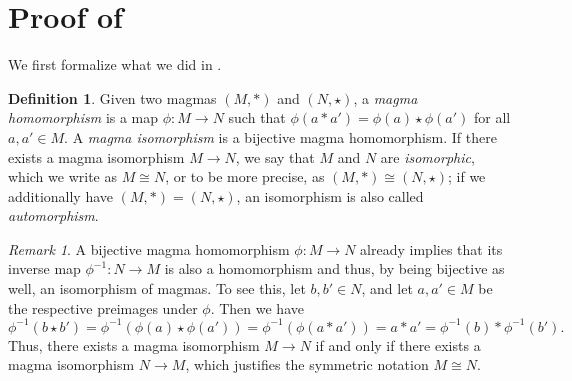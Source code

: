 \documentclass[12pt]{article}
\let\Cref\crtCref
\theoremstyle{definition}
\newtheorem{definition}[theorem]{Definition}
\theoremstyle{remark}
\newtheorem*{remark}{Remark}
\begin{document}
	\section{Proof of \Cref{thm:main}}\label{sec:pot}
	 We first formalize what we did in \Cref{ex:tables}.
	\begin{definition}\label{def:morphisms}
		Given two magmas $(M,\ast)$ and $(N,\star)$, a \emph{magma homomorphism} is a map $\phi \colon M \to N$ such that $\phi(a\ast a')=\phi(a)\star\phi(a')$ for all $a,a' \in M$. A \emph{magma isomorphism} is a bijective magma homomorphism. If there exists a magma isomorphism $M \to N$, we say that $M$ and $N$ are \emph{isomorphic}, which we write as $M \cong N$, or to be more precise, as $(M,\ast)\cong(N,\star)$; if we additionally have $(M,\ast)=(N,\star)$, an isomorphism is also called \emph{automorphism}.
	\end{definition}
	\begin{remark}
		A bijective magma homomorphism $\phi\colon M \to N$ already implies that its inverse map $\phi^{-1}\colon N \to M$ is also a homomorphism and thus, by being bijective as well, an isomorphism of magmas. To see this, let $b,b' \in N$, and let $a,a'\in M$ be the respective preimages under $\phi$. Then we have
		\[
		\phi^{-1}(b\star b') = \phi^{-1}(\phi(a)\star\phi(a')) = \phi^{-1}(\phi(a\ast a')) = a\ast a' = \phi^{-1}(b) \ast \phi^{-1}(b').
		\]
		Thus, there exists a magma isomorphism $M\to N$ if and only if there exists a magma isomorphism $N\to M$, which justifies the symmetric notation $M\cong N$.
	\end{remark}
\end{document}
